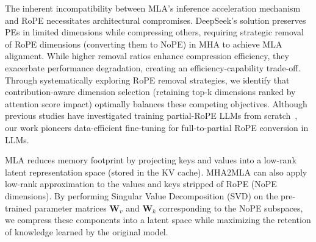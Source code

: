 The inherent incompatibility between MLA's inference acceleration mechanism and RoPE necessitates architectural compromises. 
DeepSeek's solution preserves PEs in limited dimensions while compressing others, requiring strategic removal of RoPE dimensions (converting them to NoPE) in MHA to achieve MLA alignment. 
While higher removal ratios enhance compression efficiency, they exacerbate performance degradation, creating an efficiency-capability trade-off. 
Through systematically exploring RoPE removal strategies, we identify that contribution-aware dimension selection (retaining top-k dimensions ranked by attention score impact) optimally balances these competing objectives. 
Although previous studies have investigated training partial-RoPE LLMs from scratch~\cite{gpt-neo,corr/abs-2410-06205}, our work pioneers data-efficient fine-tuning for full-to-partial RoPE conversion in LLMs.



MLA reduces memory footprint by projecting keys and values into a low-rank latent representation space (stored in the KV cache). 
MHA2MLA can also apply low-rank approximation to the values and keys stripped of RoPE (NoPE dimensions). By performing  Singular Value Decomposition (SVD) on the pre-trained parameter matrices \( \bm{W}_v \) and \( \bm{W}_k \) corresponding to the NoPE subspaces, we compress these components into a latent space while maximizing the retention of knowledge learned by the original model.  



